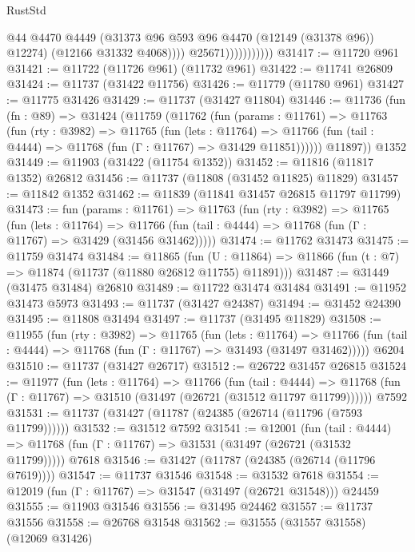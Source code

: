 \begin{lexlean}{RustStd}
\begin{coremodule}
                                @44
                                @4470
                                @4449
                                (@31373 @96 @593 @96 @4470 (@12149 (@31378 @96)) @12274)
                                (@12166 @31332 @4068))))
                          @25671)))))))))))
@31417 := @11720 @961
@31421 := @11722 (@11726 @961) (@11732 @961)
@31422 := @11741 @26809
@31424 := @11737 (@31422 @11756)
@31426 := @11779 (@11780 @961)
@31427 := @11775 @31426
@31429 := @11737 (@31427 @11804)
@31446 := @11736
    (fun (fn : @89) =>
    @31424
      (@11759
        (@11762
          (fun (params : @11761) =>
          @11763
            (fun (rty : @3982) =>
            @11765
              (fun (lets : @11764) =>
              @11766 (fun (tail : @4444) => @11768 (fun (Γ : @11767) => @31429 @11851))))))
        @11897))
    @1352
@31449 := @11903 (@31422 (@11754 @1352))
@31452 := @11816 (@11817 @1352) @26812
@31456 := @11737 (@11808 (@31452 @11825) @11829)
@31457 := @11842 @1352
@31462 := @11839 (@11841 @31457 @26815 @11797 @11799)
@31473 := fun (params : @11761) =>
  @11763
    (fun (rty : @3982) =>
    @11765
      (fun (lets : @11764) =>
      @11766 (fun (tail : @4444) => @11768 (fun (Γ : @11767) => @31429 (@31456 @31462)))))
@31474 := @11762 @31473
@31475 := @11759 @31474
@31484 := @11865
    (fun (U : @11864) => @11866 (fun (t : @7) => @11874 (@11737 (@11880 @26812 @11755) @11891)))
@31487 := @31449 (@31475 @31484) @26810
@31489 := @11722 @31474 @31484
@31491 := @11952 @31473 @5973
@31493 := @11737 (@31427 @24387)
@31494 := @31452 @24390
@31495 := @11808 @31494
@31497 := @11737 (@31495 @11829)
@31508 := @11955
    (fun (rty : @3982) =>
    @11765
      (fun (lets : @11764) =>
      @11766 (fun (tail : @4444) => @11768 (fun (Γ : @11767) => @31493 (@31497 @31462)))))
    @6204
@31510 := @11737 (@31427 @26717)
@31512 := @26722 @31457 @26815
@31524 := @11977
    (fun (lets : @11764) =>
    @11766
      (fun (tail : @4444) =>
      @11768 (fun (Γ : @11767) => @31510 (@31497 (@26721 (@31512 @11797 @11799))))))
    @7592
@31531 := @11737 (@31427 (@11787 (@24385 (@26714 (@11796 (@7593 @11799))))))
@31532 := @31512 @7592
@31541 := @12001
    (fun (tail : @4444) => @11768 (fun (Γ : @11767) => @31531 (@31497 (@26721 (@31532 @11799)))))
    @7618
@31546 := @31427 (@11787 (@24385 (@26714 (@11796 @7619))))
@31547 := @11737 @31546
@31548 := @31532 @7618
@31554 := @12019 (fun (Γ : @11767) => @31547 (@31497 (@26721 @31548))) @24459
@31555 := @11903 @31546
@31556 := @31495 @24462
@31557 := @11737 @31556
@31558 := @26768 @31548
@31562 := @31555 (@31557 @31558) (@12069 @31426)

\end{coremodule}
\end{lexlean}
